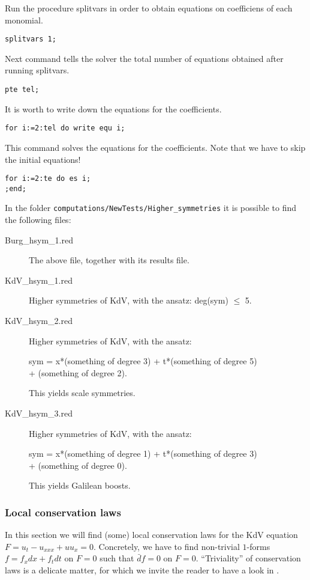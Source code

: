 Run the procedure splitvars in order to obtain equations on coefficiens
of each monomial.
\begin{verbatim}
splitvars 1;
\end{verbatim}

Next command tells the solver the total number of equations obtained
after running splitvars.
\begin{verbatim}
pte tel;
\end{verbatim}

It is worth to write down the equations for the coefficients.
\begin{verbatim}
for i:=2:tel do write equ i;
\end{verbatim}

This command solves the equations for the coefficients.
Note that we have to skip the initial equations!
\begin{verbatim}
for i:=2:te do es i;
;end;
\end{verbatim}

In the folder \texttt{computations/NewTests/Higher\_symmetries} it is possible
to find the following files:
\begin{description}
\item[Burg\_hsym\_1.red] The above file, together with its results file.
  \item[KdV\_hsym\_1.red] Higher symmetries of KdV, with the ansatz:
    deg(sym) $\leq$ 5.
\item[KdV\_hsym\_2.red] Higher symmetries of KdV, with the ansatz:
  \begin{center}
    sym = x*(something of degree 3) + t*(something of degree  5)\\
  + (something of degree 2).
  \end{center}
    This yields scale symmetries.
\item[KdV\_hsym\_3.red] Higher symmetries of KdV, with the ansatz:
  \begin{center}
    sym = x*(something of degree 1) + t*(something of degree 3)\\
    + (something of degree 0).
  \end{center}
This yields Galilean boosts.
\end{description}

\subsubsection{Local conservation laws}
\label{sec:local-cons-laws}

In this section we will find (some) local conservation laws for the KdV
equation $F=u_t-u_{xxx}+uu_x=0$. Concretely, we have to find non-trivial $1$-forms
$f=f_xdx+f_tdt$ on $F=0$ such that $\bar d f=0$ on $F=0$. ``Triviality'' of
conservation laws is a delicate matter, for which we invite the reader to have
a look in \cite{Many}.


